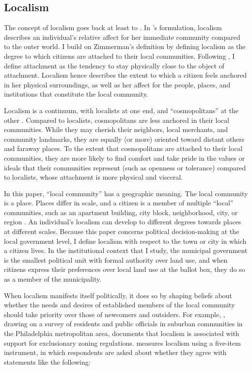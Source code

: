 \documentclass[article,12pt]{memoir}
\begin{document}
\subsection{Localism} 
The concept of localism goes back at least to \citet{zimmerman_centralism_1938}. In \citeauthor{zimmerman_centralism_1938}'s formulation, localism describes an individual's relative affect for her immediate community compared to the outer world. I build on Zimmerman's definition by defining localism as the degree to which citizens are attached to their local communities.  Following \citet{hidalgo_place_2001}, I define attachment as the tendency to stay physically close to the object of attachment.  Localism hence describes the extent to which a citizen feels anchored in her physical surroundings, as well as her affect for the people, places, and institutions that constitute the local community.  

Localism is a continuum, with localists at one end, and ``cosmopolitans'' at the other \citep{dye_local-cosmopolitan_1963-1,merton_social_1968}. Compared to localists, cosmopolitans are less anchored in their local communities. While they may cherish their neighbors, local merchants, and community landmarks, they are equally (or more) oriented toward distant others and faraway places. To the extent that cosmopolitans are attached to their local communities, they are more likely to find comfort and take pride in the values or ideals that their communities represent (such as openness or tolerance) compared to localists, whose attachment is more physical and visceral.

In this paper, ``local community'' has a geographic meaning. The local community is a place.  Places differ in scale, and a citizen is a member of multiple ``local'' communities, such as an apartment building, city block, neighborhood, city, or region \citep{hidalgo_place_2001,lewicka_what_2010}.  An individual's localism can develop to different degrees towards places at different scales.  Because this paper concerns political decision-making at the local government level, I define localism with respect to the town or city in which a citizen lives.  In the institutional context that I study, the municipal government is the smallest political unit with formal authority over land use, and when citizens express their preferences over local land use at the ballot box, they do so as a member of the municipality.

When localism manifests itself politically, it does so by shaping beliefs about whether the needs and desires of established members of the local community should take priority over those of newcomers and outsiders. For example, \citet{dye_local-cosmopolitan_1963-1}, drawing on a survey of residents and public officials in suburban communities in the Philadelphia metropolitan area, documents that localism is associated with support for exclusionary zoning regulations. \citeauthor{dye_local-cosmopolitan_1963-1} measures localism using a five-item instrument, in which respondents are asked about whether they agree with statements like the following:
\end{document}
